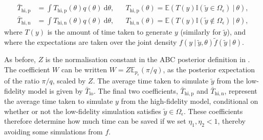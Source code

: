 \documentclass[review]{siamonline190516}
\begin{document}
\begin{lemma}
\begin{subequations}
\begin{align}
\bar T_{\mathrm{hi,p}} &= \int T_{\mathrm{hi,p}}(\theta) q(\theta) ~\mathrm d\theta
,&
&T_{\mathrm{hi,p}}(\theta) = \mathbb E\left( T(y) \mathbb I(\tilde y \in \Omega_\epsilon) ~|~ \theta \right)
,\\
\bar T_{\mathrm{hi,n}} &= \int T_{\mathrm{hi,n}}(\theta) q(\theta) ~\mathrm d\theta
,&
&T_{\mathrm{hi,n}}(\theta) = \mathbb E\left( T(y) \mathbb I(\tilde y \notin \Omega_\epsilon) ~|~ \theta \right)
,
\end{align}
\end{subequations}
where $T(y)$ is the amount of time taken to generate $y$ (similarly for $\tilde y$), and where the expectations are taken over the joint density $f(y~|~\tilde y, \theta) \tilde f(\tilde y~|~\theta)$.
\end{lemma}

As before, $Z$ is the normalisation constant in the ABC posterior definition in .
The coefficient $W$ can be written $W = Z \mathbb E_{p_\epsilon}(\pi/q)$, as the posterior expectation of the ratio $\pi / q$, scaled by $Z$.
The average time taken to simulate $\tilde y$ from the low-fidelity model is given by $\bar T_{\mathrm{lo}}$.
The final two coefficients, $\bar T_{\mathrm{hi,p}}$ and $\bar T_{\mathrm{hi,n}}$, represent the average time taken to simulate $y$ from the high-fidelity model, conditional on whether or not the low-fidelity simulation satisfies $\tilde y \in \Omega_\epsilon$.
These coefficients therefore determine how much time can be saved if we set $\eta_1,\eta_2 < 1$, thereby avoiding some simulations from $f$.
\end{document}

